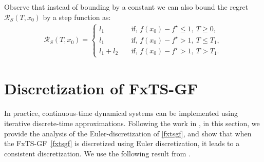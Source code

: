 \documentclass[letterpaper]{article}
\begin{document}
Observe that instead of bounding by a constant we can also bound the regret $\mathcal{R}_S(T,x_0)$ by a step function as:
\begin{align*}
\mathcal{R}_S(T,x_0)= \begin{cases}
l_1 \quad &\text{if, } f(x_0)-f^\star \leq1, \: T\geq 0,\\
l_1 \quad &\text{if, } f(x_0)-f^\star >1, \: T\leq T_1,\\
l_1+l_2 \quad &\text{if, } f(x_0)-f^\star >1, \: T> T_1.
\end{cases}
\end{align*}


\section{Discretization of FxTS-GF} \label{sec: discretization}
In practice, continuous-time dynamical systems can be implemented using iterative discrete-time approximations.
Following the work in \cite{garg2021MVIP,benosman2020optimizing},
in this section, we provide the analysis of the Euler-discretization of \eqref{fxtsgf}, and show that when the FxTS-GF~\eqref{fxtsgf} is discretized using Euler discretization, it leads to a consistent discretization. We use the following result from \cite{garg2021MVIP}.
\end{document}
